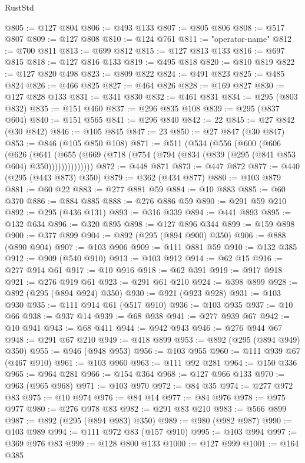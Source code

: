\begin{lexlean}{RustStd}
\begin{coremodule}
@805 := @127 @804
@806 := @493 @133
@807 := @805 @806
@808 := @517 @807
@809 := @127 @808
@810 := @124 @761
@811 := "operator-name"
@812 := @700 @811
@813 := @699 @812
@815 := @127 @813 @133
@816 := @697 @815
@818 := @127 @816 @133
@819 := @495 @818
@820 := @810 @819
@822 := @127 @820 @498
@823 := @809 @822
@824 := @491 @823
@825 := @485 @824
@826 := @466 @825
@827 := @464 @826
@828 := @169 @827
@830 := @127 @828 @133
@831 := @341 @830
@832 := @461 @831
@834 := @295 (@803 @832)
@835 := @151 @460
@837 := @296 @835 @108
@839 := @295 (@837 @604)
@840 := @151 @565
@841 := @296 @840
@842 := 22
@845 := @27 @842 (@30 @842)
@846 := @105 @845
@847 := 23
@850 := @27 @847 (@30 @847)
@853 := @846 (@105 @850 @108)
@871 := @511
    (@534
      (@556
        (@600
          (@606
            (@626
              (@641
                (@655 (@669 (@718 (@754 (@794 (@834 (@839 (@295 (@841 @853 @604) @350))))))))))))))
@872 := @448 @871
@873 := @447 @872
@877 := @440 (@295 (@443 @873) @350)
@879 := @362 (@434 @877)
@880 := @103 @879
@881 := @60 @22
@883 := @277 @881 @59
@884 := @10 @883
@885 := @60 @370
@886 := @884 @885
@888 := @276 @886 @59
@890 := @291 @59 @210
@892 := @295 (@436 @131)
@893 := @316 @339
@894 := @441 @893
@895 := @132 @634
@896 := @320 @895
@898 := @127 @896 @344
@899 := @159 @898
@900 := @377 @899
@904 := @892 (@295 (@894 @900) @350)
@906 := @888 (@890 @904)
@907 := @103 @906
@909 := @111 @881 @59
@910 := @132 @385
@912 := @909 (@540 @910)
@913 := @103 @912
@914 := @62 @15
@916 := @277 @914 @61
@917 := @10 @916
@918 := @62 @391
@919 := @917 @918
@921 := @276 @919 @61
@923 := @291 @61 @210
@924 := @398 @899
@928 := @892 (@295 (@894 @924) @350)
@930 := @921 (@923 @928)
@931 := @103 @930
@935 := @111 @914 @61 (@517 @910)
@936 := @103 @935
@937 := @10 @66
@938 := @937 @14
@939 := @68 @938
@941 := @277 @939 @67
@942 := @10 @941
@943 := @68 @411
@944 := @942 @943
@946 := @276 @944 @67
@948 := @291 @67 @210
@949 := @418 @899
@953 := @892 (@295 (@894 @949) @350)
@955 := @946 (@948 @953)
@956 := @103 @955
@960 := @111 @939 @67 (@467 @910)
@961 := @103 @960
@963 := @111 @92 @281
@964 := @150 @336
@965 := @964 @281
@966 := @154 @364
@968 := @127 @966 @133
@970 := @963 (@965 @968)
@971 := @103 @970
@972 := @84 @35
@974 := @277 @972 @83
@975 := @10 @974
@976 := @84 @14
@977 := @84 @976
@978 := @975 @977
@980 := @276 @978 @83
@982 := @291 @83 @210
@983 := @566 @899
@987 := @892 (@295 (@894 @983) @350)
@989 := @980 (@982 @987)
@990 := @103 @989
@994 := @111 @972 @83 (@157 @910)
@995 := @103 @994
@997 := @369 @976 @83
@999 := @128 @800 @133
@1000 := @127 @999
@1001 := @164 @385

\end{coremodule}
\end{lexlean}
